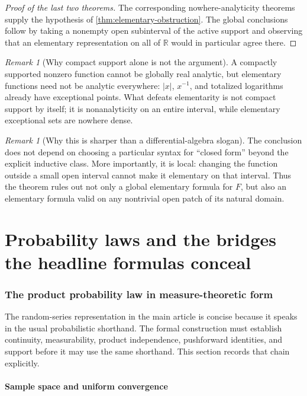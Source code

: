 \documentclass[11pt,oneside]{article}
\theoremstyle{definition}
\theoremstyle{remark}
\newtheorem{remark}[theorem]{Remark}
\newcommand{\R}{\mathbb R}
\begin{document}
\begin{proof}[Proof of the last two theorems]
The corresponding nowhere-analyticity theorems supply the hypothesis of
\cref{thm:elementary-obstruction}.  The global conclusions follow by taking a nonempty open
subinterval of the active support and observing that an elementary representation on all of
$\R$ would in particular agree there.
\end{proof}

\begin{remark}[Why compact support alone is not the argument]
A compactly supported nonzero function cannot be globally real analytic, but elementary
functions need not be analytic everywhere: $|x|$, $x^{-1}$, and totalized logarithms already
have exceptional points.  What defeats elementarity is not compact support by itself; it is
nonanalyticity on an entire interval, while elementary exceptional sets are nowhere dense.
\end{remark}

\begin{remark}[Why this is sharper than a differential-algebra slogan]
The conclusion does not depend on choosing a particular syntax for ``closed form'' beyond
the explicit inductive class.  More importantly, it is local: changing the function outside
a small open interval cannot make it elementary on that interval.  Thus the theorem rules
out not only a global elementary formula for $F$, but also an elementary formula valid on
any nontrivial open patch of its natural domain.
\end{remark}

\part{Probability laws and the bridges the headline formulas conceal}

\section{The product probability law in measure-theoretic form}
\label{sec:product-law}

The random-series representation in the main article is concise because it speaks in the
usual probabilistic shorthand.  The formal construction must establish continuity,
measurability, product independence, pushforward identities, and support before it may use
the same shorthand.  This section records that chain explicitly.

\subsection{Sample space and uniform convergence}
\end{document}
